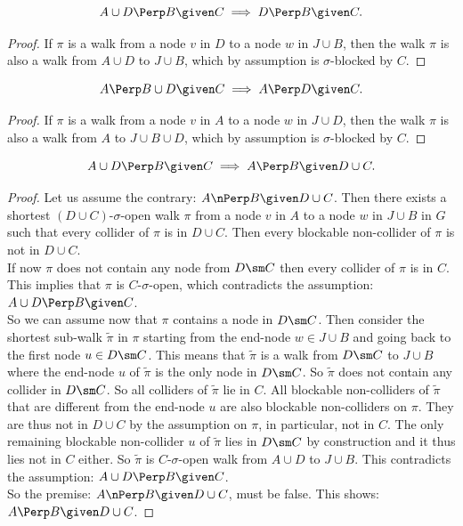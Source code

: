 \begin{Lem}
    \[ A \cup D \Perp  B \given C \implies D \Perp  B \given C.\]
\begin{proof}
If $\pi$ is a walk from a node $v$ in $D$ to a node $w$ in $J \cup B$, then 
the walk $\pi$ is also a walk from $A \cup D$ to $J \cup B$, which by assumption is $\sigma$-blocked by $C$.
\end{proof}
\end{Lem}

\begin{Lem}
    \[ A \Perp  B \cup D\given C  \implies A \Perp  D \given C.\]
\begin{proof}
If $\pi$ is a walk from a node $v$ in $A$ to a node $w$ in $J \cup D$, then %
the walk  $\pi$ is also a walk from $A$ to $J \cup B \cup D$, which by assumption is $\sigma$-blocked by $C$. 
\end{proof}
\end{Lem}

\begin{Lem}
    \label{s-sep-left-weak-union}
    \[A \cup D \Perp  B  \given C \implies A \Perp  B \given D\cup C.\]
\begin{proof}
    Let us assume the contrary:  $A \nPerp  B \given D\cup C$. Then there exists a shortest $(D \cup C)$-$\sigma$-open walk $\pi$ 
    from a node $v$ in $A$ to a node $w$ in $J \cup B$ in $G$ such that every collider of $\pi$ is in $D \cup C$.
    Then every blockable non-collider of $\pi$ is not in $D \cup C$.\\
    If now $\pi$ does not contain any node from $D \sm C$ then every collider of $\pi$ is in $C$. 
    This implies that $\pi$ is $C$-$\sigma$-open, 
    which contradicts the assumption: $A \cup D \Perp  B  \given C$.\\
    So we can assume now that $\pi$ contains a node in $D \sm C$. 
    Then consider the shortest sub-walk $\tilde \pi$ in $\pi$ starting from the end-node $w \in J \cup B$ and going back to the first node $u \in D \sm C$.
    This means that $\tilde \pi$ is a walk from $D \sm C$ to $J \cup B$ where the end-node $u$ of $\tilde \pi$ is the only node in $D\sm C$. So $\tilde \pi$ does not contain any collider in $D\sm C$.
    So all colliders of $\tilde \pi$ lie in $C$. 
    All blockable non-colliders of $\tilde \pi$ that are different from the end-node $u$ are also blockable non-colliders on $\pi$. 
    They are thus not in $D \cup C$ by the assumption on $\pi$, in particular, not in $C$. 
    The only remaining blockable non-collider $u$ of $\tilde \pi$ lies in $D \sm C$ by construction and it thus lies not in $C$ either.
    So $\tilde \pi$ is $C$-$\sigma$-open walk from $A \cup D$ to $J \cup B$. 
    This contradicts the assumption: $A \cup D \Perp  B  \given C$. \\
    So the premise: $A \nPerp  B \given D\cup C$, must be false. This shows: $A \Perp  B \given D\cup C$.
\end{proof}
\end{Lem}

